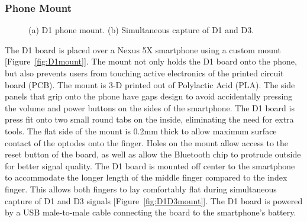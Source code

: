 \subsubsection{Phone Mount}
\begin{figure}
    \begin{center}
    \end{center}
    \caption{(a) D1 phone mount. (b) Simultaneous capture of D1 and D3.} 
    \label{fig:D1hardware}
\end{figure} 
The D1 board is placed over a Nexus 5X smartphone using a custom mount [Figure~\ref{fig:D1mount}]. The mount not only holds the D1 board onto the phone, but also prevents users from touching active electronics of the printed circuit board (PCB). The mount is 3-D printed out of Polylactic Acid (PLA). The side panels that grip onto the phone have gaps design to avoid accidentally pressing the volume and power buttons on the sides of the smartphone. The D1 board is press fit onto two small round tabs on the inside, eliminating the need for extra tools. The flat side of the mount is 0.2mm thick to allow maximum surface contact of the optodes onto the finger. Holes on the mount allow access to the reset button of the board, as well as allow the Bluetooth chip to protrude outside for better signal quality. The D1 board is mounted off center to the smartphone to accommodate the longer length of the middle finger compared to the index finger. This allows both fingers to lay comfortably flat during simultaneous capture of D1 and D3 signals [Figure~\ref{fig:D1D3mount}]. The D1 board is powered by a USB male-to-male cable connecting the board to the smartphone’s battery. 

